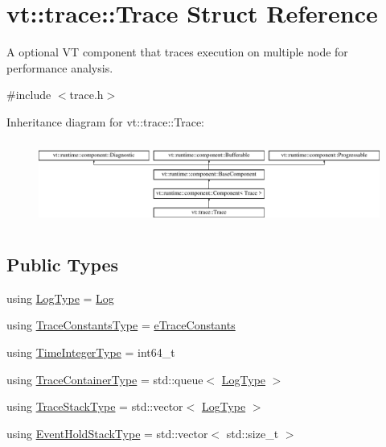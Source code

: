 \hypertarget{structvt_1_1trace_1_1_trace}{}\section{vt\+:\+:trace\+:\+:Trace Struct Reference}
\label{structvt_1_1trace_1_1_trace}


A optional VT component that traces execution on multiple node for performance analysis.  




{\ttfamily \#include $<$trace.\+h$>$}

Inheritance diagram for vt\+:\+:trace\+:\+:Trace\+:\begin{figure}[H]
\begin{center}
\leavevmode
\includegraphics[height=2.765432cm]{structvt_1_1trace_1_1_trace}
\end{center}
\end{figure}
\subsection*{Public Types}
\begin{DoxyCompactItemize}
\item 
using \hyperlink{structvt_1_1trace_1_1_trace_a43306d96a91e49db081eaea016f1dd0a}{Log\+Type} = \hyperlink{structvt_1_1trace_1_1_log}{Log}
\item 
using \hyperlink{structvt_1_1trace_1_1_trace_accb35b20499dfdd46e6c79daae9fc265}{Trace\+Constants\+Type} = \hyperlink{namespacevt_1_1trace_acf454dfbd581b0ebae895f90b5927a1d}{e\+Trace\+Constants}
\item 
using \hyperlink{structvt_1_1trace_1_1_trace_ab8db9218a8ab87f59773fcbf81433787}{Time\+Integer\+Type} = int64\+\_\+t
\item 
using \hyperlink{structvt_1_1trace_1_1_trace_a9d07ee9d9e92f63674da9954cfe9830b}{Trace\+Container\+Type} = std\+::queue$<$ \hyperlink{structvt_1_1trace_1_1_trace_a43306d96a91e49db081eaea016f1dd0a}{Log\+Type} $>$
\item 
using \hyperlink{structvt_1_1trace_1_1_trace_af27d223028d10a196680513defcef3d6}{Trace\+Stack\+Type} = std\+::vector$<$ \hyperlink{structvt_1_1trace_1_1_trace_a43306d96a91e49db081eaea016f1dd0a}{Log\+Type} $>$
\item 
using \hyperlink{structvt_1_1trace_1_1_trace_a727542f4171681f2ef03df2c3abce04c}{Event\+Hold\+Stack\+Type} = std\+::vector$<$ std\+::size\+\_\+t $>$
\end{DoxyCompactItemize}
